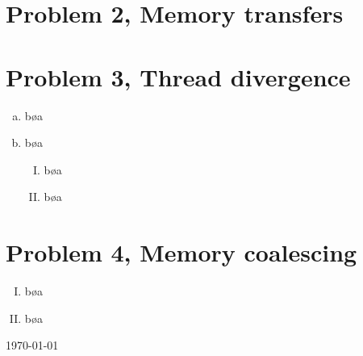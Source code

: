 \documentclass[fontsize=11pt, paper=a4, titlepage]{article}
\begin{document}
\section*{Problem 2, Memory transfers}


\section*{Problem 3, Thread divergence}
\begin{enumerate}[a)]

    \item bøa

    \item bøa

    \begin{enumerate}[I)]

        \item bøa

        \item bøa

    \end{enumerate}
\end{enumerate}

\section*{Problem 4, Memory coalescing}
\begin{enumerate}[I)]

    \item bøa

    \item bøa

\end{enumerate}

\vfill
\hfill \large{\today}
\end{document}
